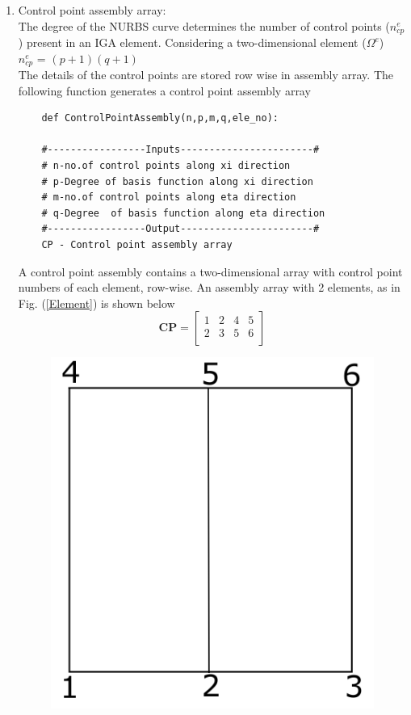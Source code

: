 \documentclass[11pt]{article}
\begin{document}
\begin{enumerate}[leftmargin=*]
	\item Control point assembly array: \\
	The degree of the NURBS curve determines the number of control points ($n^e_{cp}$) present in an IGA element.
	Considering a two-dimensional element ($\Omega^e$)\\
	$n^e_{cp}$ = $(p+1)(q+1)$ \\
	The details of the control points are stored row wise in assembly array.
	The following function generates a control point assembly array
	\begin{verbatim}
	def ControlPointAssembly(n,p,m,q,ele_no):
	
	#-----------------Inputs-----------------------#
	# n-no.of control points along xi direction
	# p-Degree of basis function along xi direction
	# m-no.of control points along eta direction
	# q-Degree  of basis function along eta direction
	#-----------------Output-----------------------#
	CP - Control point assembly array
	\end{verbatim}
	A control point assembly contains a two-dimensional array with control point numbers of each element, row-wise.
	An assembly array with 2 elements, as in Fig. (\ref{Element}) is shown below
	\begin{equation} \label{CPassembly}
	\textbf{CP} =
	\begin{bmatrix}
		1 & 2 & 4 & 5 \\
		2 & 3 & 5 & 6 \\
	\end{bmatrix}
	\end{equation}
	\begin{figure}[H]
		\begin{center}
			\includegraphics[scale=0.2]{Element.png} 

\end{center}
\end{figure}
\end{enumerate}
\end{document}
